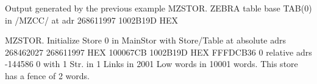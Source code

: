 \begin{landscapebody}
%                                                                                                                                 
%
%
%
\begin{XMPt}{Output generated by the previous example}
MZSTOR.  ZEBRA table base TAB(0) in /MZCC/ at adr   268611997    1002B19D HEX

MZSTOR.  Initialize Store  0  in MainStor
         with Store/Table at absolute adrs   268462027   268611997
                                       HEX    100067CB    1002B19D
                                       HEX    FFFDCB36           0
                             relative adrs     -144586           0
         with     1 Str. in     1 Links in   2001 Low words in   10001 words.
         This store has a fence of    2 words.


\end{XMPt}
\end{landscapebody}
